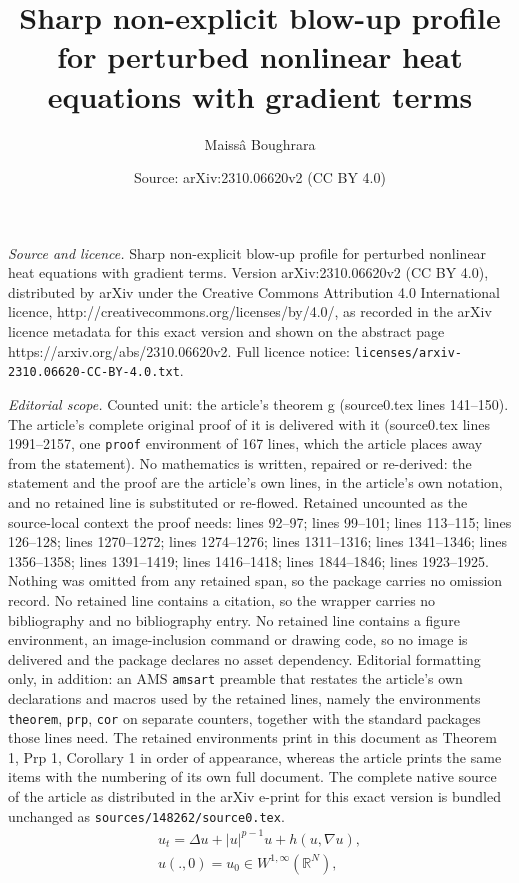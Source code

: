 \documentclass[10pt,a4paper]{amsart}
\title{Sharp non-explicit blow-up profile for perturbed nonlinear heat equations with gradient terms}
\author{Maiss\^a Boughrara}
\date{Source: arXiv:2310.06620v2 (CC BY 4.0)}
\newcommand{\R}{\numberset{R}}
\newcommand{\numberset}{\mathbb}
\begin{document}
\maketitle

\noindent\emph{Source and licence.} Sharp non-explicit blow-up profile for perturbed nonlinear heat equations with gradient terms. Version arXiv:2310.06620v2 (CC BY 4.0), distributed by arXiv under the Creative Commons Attribution 4.0 International licence, http://creativecommons.org/licenses/by/4.0/, as recorded in the arXiv licence metadata for this exact version and shown on the abstract page https://arxiv.org/abs/2310.06620v2. Full licence notice: \texttt{licenses/arxiv-2310.06620-CC-BY-4.0.txt}.\par\smallskip

\noindent\textit{Editorial scope.} Counted unit: the article's theorem g (source0.tex lines 141--150). The article's complete original proof of it is delivered with it (source0.tex lines 1991--2157, one \texttt{proof} environment of 167 lines, which the article places away from the statement). No mathematics is written, repaired or re-derived: the statement and the proof are the article's own lines, in the article's own notation, and no retained line is substituted or re-flowed.  Retained uncounted as the source-local context the proof needs: lines 92--97; lines 99--101; lines 113--115; lines 126--128; lines 1270--1272; lines 1274--1276; lines 1311--1316; lines 1341--1346; lines 1356--1358; lines 1391--1419; lines 1416--1418; lines 1844--1846; lines 1923--1925.  Nothing was omitted from any retained span, so the package carries no omission record.  No retained line contains a citation, so the wrapper carries no bibliography and no bibliography entry.  No retained line contains a figure environment, an image-inclusion command or drawing code, so no image is delivered and the package declares no asset dependency.  Editorial formatting only, in addition: an AMS \texttt{amsart} preamble that restates the article's own declarations and macros used by the retained lines, namely the environments \texttt{theorem}, \texttt{prp}, \texttt{cor} on separate counters, together with the standard packages those lines need.  The retained environments print in this document as Theorem 1, Prp 1, Corollary 1 in order of appearance, whereas the article prints the same items with the numbering of its own full document.  The complete native source of the article as distributed in the arXiv e-print for this exact version is bundled unchanged as \texttt{sources/148262/source0.tex}.
\begin{equation}\label{eq:1}
\begin{split}
u_t=\Delta u+|u|^{p-1}u+h(u,\nabla u),\\
u(.,0)=u_0\in W^{1,\infty}(\R^N),
\end{split}
\end{equation}
\end{document}
